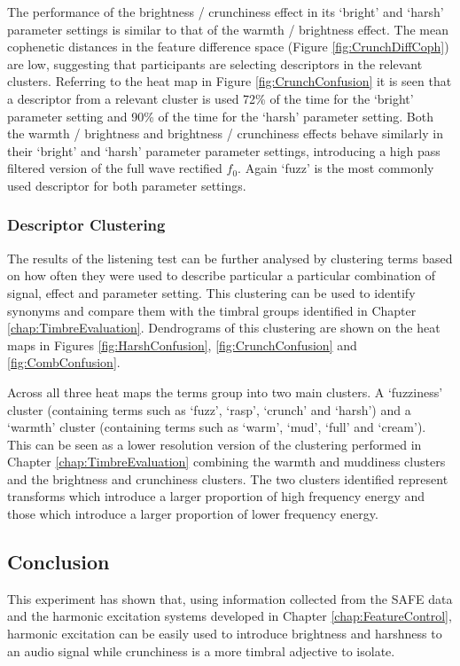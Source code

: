 			The performance of the brightness / crunchiness effect in its `bright' and `harsh' parameter
			settings is similar to that of the warmth / brightness effect. The mean cophenetic distances in the
			feature difference space (Figure \ref{fig:CrunchDiffCoph}) are low, suggesting that participants
			are selecting descriptors in the relevant clusters. Referring to the heat map in Figure
			\ref{fig:CrunchConfusion} it is seen that a descriptor from a relevant cluster is used 72\% of the
			time for the `bright' parameter setting and 90\% of the time for the `harsh' parameter setting.
			Both the warmth / brightness and brightness / crunchiness effects behave similarly in their
			`bright' and `harsh' parameter parameter settings, introducing a high pass filtered version of the
			full wave rectified $f_{0}$. Again `fuzz' is the most commonly used descriptor for both parameter
			settings.

		\subsubsection*{Descriptor Clustering}
			The results of the listening test can be further analysed by clustering terms based on how often
			they were used to describe particular a particular combination of signal, effect and parameter
			setting. This clustering can be used to identify synonyms and compare them with the timbral groups
			identified in Chapter \ref{chap:TimbreEvaluation}. Dendrograms of this clustering are shown on the
			heat maps in Figures \ref{fig:HarshConfusion}, \ref{fig:CrunchConfusion} and
			\ref{fig:CombConfusion}.

			Across all three heat maps the terms group into two main clusters. A `fuzziness' cluster
			(containing terms such as `fuzz', `rasp', `crunch' and `harsh') and a `warmth' cluster (containing
			terms such as `warm', `mud', `full' and `cream'). This can be seen as a lower resolution version of
			the clustering performed in Chapter \ref{chap:TimbreEvaluation} combining the warmth and muddiness
			clusters and the brightness and crunchiness clusters. The two clusters identified represent
			transforms which introduce a larger proportion of high frequency energy and those which introduce a
			larger proportion of lower frequency energy.

	\subsection{Conclusion}
	\label{sec:PerceptualExperiments-SemanticControl-Conclusion}
		This experiment has shown that, using information collected from the SAFE data and the harmonic excitation
		systems developed in Chapter \ref{chap:FeatureControl}, harmonic excitation can be easily used to introduce
		brightness and harshness to an audio signal while crunchiness is a more timbral adjective to isolate.

